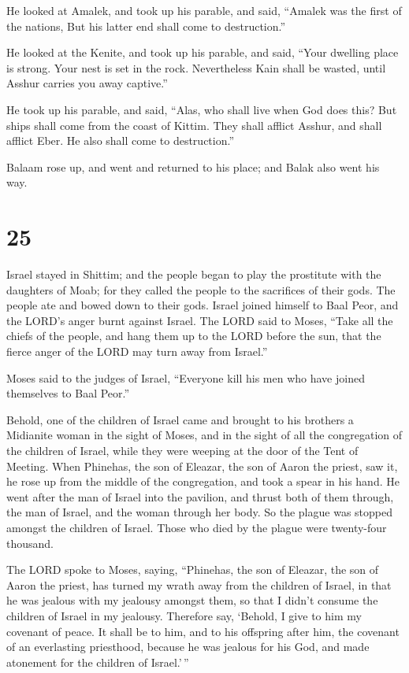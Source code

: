  He looked at Amalek, and took up his parable, and said,
``Amalek was the first of the nations, But his latter end shall come to
destruction.''

 He looked at the Kenite, and took up his parable, and
said, ``Your dwelling place is strong. Your nest is set in the rock.
 Nevertheless Kain shall be wasted, until Asshur carries
you away captive.''

 He took up his parable, and said, ``Alas, who shall live
when God does this?  But ships shall come from the coast of
Kittim. They shall afflict Asshur, and shall afflict Eber. He also shall
come to destruction.''

 Balaam rose up, and went and returned to his place; and
Balak also went his way.

\hypertarget{section-24}{%
\section{25}\label{section-24}}

 Israel stayed in Shittim; and the people began to play the
prostitute with the daughters of Moab;  for they called the
people to the sacrifices of their gods. The people ate and bowed down to
their gods.  Israel joined himself to Baal Peor, and the
LORD's anger burnt against Israel.  The LORD said to Moses,
``Take all the chiefs of the people, and hang them up to the LORD before
the sun, that the fierce anger of the LORD may turn away from Israel.''

 Moses said to the judges of Israel, ``Everyone kill his men
who have joined themselves to Baal Peor.''

 Behold, one of the children of Israel came and brought to
his brothers a Midianite woman in the sight of Moses, and in the sight
of all the congregation of the children of Israel, while they were
weeping at the door of the Tent of Meeting.  When Phinehas,
the son of Eleazar, the son of Aaron the priest, saw it, he rose up from
the middle of the congregation, and took a spear in his hand.
 He went after the man of Israel into the pavilion, and
thrust both of them through, the man of Israel, and the woman through
her body. So the plague was stopped amongst the children of Israel.
 Those who died by the plague were twenty-four thousand.

 The LORD spoke to Moses, saying,  ``Phinehas,
the son of Eleazar, the son of Aaron the priest, has turned my wrath
away from the children of Israel, in that he was jealous with my
jealousy amongst them, so that I didn't consume the children of Israel
in my jealousy.  Therefore say, `Behold, I give to him my
covenant of peace.  It shall be to him, and to his
offspring after him, the covenant of an everlasting priesthood, because
he was jealous for his God, and made atonement for the children of
Israel.'\,''

